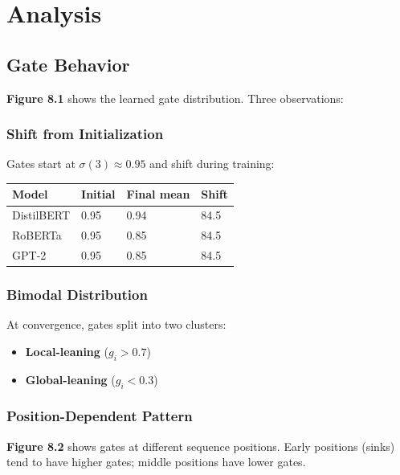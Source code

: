 
\section{Analysis}

\subsection{Gate Behavior}

\textbf{Figure 8.1} shows the learned gate distribution. Three observations:

\subsubsection{Shift from Initialization}

Gates start at $\sigma(3) \approx 0.95$ and shift during training:

\begin{table}[H]
\centering
\small
\begin{tabular}{llll}
\toprule
\textbf{Model} & \textbf{Initial} & \textbf{Final mean} & \textbf{Shift} \\
\midrule
DistilBERT & 0.95 & 0.94 & 84.5 \\
RoBERTa & 0.95 & 0.85 & 84.5 \\
GPT-2 & 0.95 & 0.85 & 84.5 \\
\bottomrule
\end{tabular}
\end{table}

\subsubsection{Bimodal Distribution}

At convergence, gates split into two clusters:
\begin{itemize}
\item \textbf{Local-leaning} ($g_i > 0.7$)
\item \textbf{Global-leaning} ($g_i < 0.3$)

\end{itemize}
\subsubsection{Position-Dependent Pattern}

\textbf{Figure 8.2} shows gates at different sequence positions. Early positions 
(sinks) tend to have higher gates; middle positions have lower gates.

